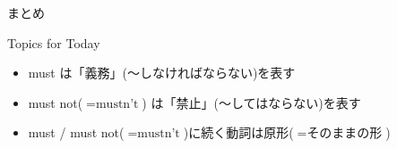 \documentclass[aspectratio=169,xcolor={dvipsnames,table}]{beamer}
\begin{document}
\begin{frame}[plain]{まとめ}
 \Large

\begin{exampleblock}{Topics for Today}
\small
\begin{itemize}
 \item<2->  must は「義務」(〜しなければならない)を表す
 \item<3->  must not($=\text{mustn't}$) は「禁止」(〜してはならない)を表す
 \item<4->  must / must not($=\text{mustn't}$)に続く動詞は原形($=\text{そのままの形}$)
\end{itemize}

\end{exampleblock}

\vfill


\end{frame}
\end{document}
